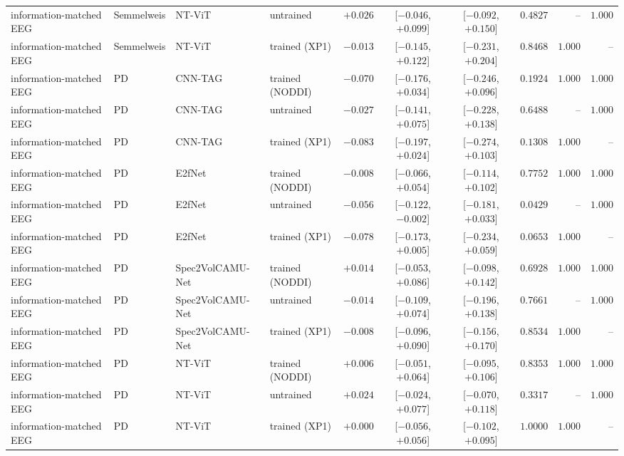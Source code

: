 \documentclass[10pt]{article}
\begin{document}
\begin{longtable}{l l l l r c c r r r}
        information-matched EEG & Semmelweis & NT-ViT & untrained & $+0.026$ & [$-0.046$, $+0.099$] & [$-0.092$, $+0.150$] & $0.4827$ & -- & $1.000$ \\
        information-matched EEG & Semmelweis & NT-ViT & trained (XP1) & $-0.013$ & [$-0.145$, $+0.122$] & [$-0.231$, $+0.204$] & $0.8468$ & $1.000$ & -- \\
        information-matched EEG & PD & CNN-TAG & trained (NODDI) & $-0.070$ & [$-0.176$, $+0.034$] & [$-0.246$, $+0.096$] & $0.1924$ & $1.000$ & $1.000$ \\
        information-matched EEG & PD & CNN-TAG & untrained & $-0.027$ & [$-0.141$, $+0.075$] & [$-0.228$, $+0.138$] & $0.6488$ & -- & $1.000$ \\
        information-matched EEG & PD & CNN-TAG & trained (XP1) & $-0.083$ & [$-0.197$, $+0.024$] & [$-0.274$, $+0.103$] & $0.1308$ & $1.000$ & -- \\
        information-matched EEG & PD & E2fNet & trained (NODDI) & $-0.008$ & [$-0.066$, $+0.054$] & [$-0.114$, $+0.102$] & $0.7752$ & $1.000$ & $1.000$ \\
        information-matched EEG & PD & E2fNet & untrained & $-0.056$ & [$-0.122$, $-0.002$] & [$-0.181$, $+0.033$] & $0.0429$ & -- & $1.000$ \\
        information-matched EEG & PD & E2fNet & trained (XP1) & $-0.078$ & [$-0.173$, $+0.005$] & [$-0.234$, $+0.059$] & $0.0653$ & $1.000$ & -- \\
        information-matched EEG & PD & Spec2VolCAMU-Net & trained (NODDI) & $+0.014$ & [$-0.053$, $+0.086$] & [$-0.098$, $+0.142$] & $0.6928$ & $1.000$ & $1.000$ \\
        information-matched EEG & PD & Spec2VolCAMU-Net & untrained & $-0.014$ & [$-0.109$, $+0.074$] & [$-0.196$, $+0.138$] & $0.7661$ & -- & $1.000$ \\
        information-matched EEG & PD & Spec2VolCAMU-Net & trained (XP1) & $-0.008$ & [$-0.096$, $+0.090$] & [$-0.156$, $+0.170$] & $0.8534$ & $1.000$ & -- \\
        information-matched EEG & PD & NT-ViT & trained (NODDI) & $+0.006$ & [$-0.051$, $+0.064$] & [$-0.095$, $+0.106$] & $0.8353$ & $1.000$ & $1.000$ \\
        information-matched EEG & PD & NT-ViT & untrained & $+0.024$ & [$-0.024$, $+0.077$] & [$-0.070$, $+0.118$] & $0.3317$ & -- & $1.000$ \\
        information-matched EEG & PD & NT-ViT & trained (XP1) & $+0.000$ & [$-0.056$, $+0.056$] & [$-0.102$, $+0.095$] & $1.0000$ & $1.000$ & -- \\

\end{longtable}
\end{document}
